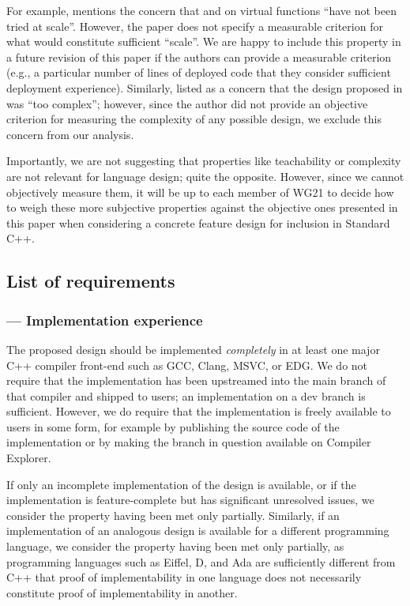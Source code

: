 For example, \cite{P3573R0} mentions the concern that  and  on virtual functions ``have not been tried at scale''. However, the paper does not specify a measurable criterion for what would constitute sufficient ``scale''. We are happy to include this property in a future revision of this paper if the authors can provide a measurable criterion (e.g., a particular number of lines of deployed code that they consider sufficient deployment experience). Similarly, \cite{P3506R0} listed as a concern that the design proposed in \cite{P3097R0} was ``too complex''; however, since the author did not provide an objective criterion for measuring the complexity of any possible design, we exclude this concern from our analysis.

Importantly, we are not suggesting that properties like teachability or complexity are not relevant for language design; quite the opposite. However, since we cannot objectively measure them, it will be up to each member of WG21 to decide how to weigh these more subjective properties against the objective ones presented in this paper when considering a concrete feature design for inclusion in Standard C++.

\subsection{List of requirements}

\subsubsection{ --- Implementation experience}

The proposed design should be implemented \emph{completely} in at least one major C++ compiler front-end such as GCC, Clang, MSVC, or EDG. We do not require that the implementation has been upstreamed into the main branch of that compiler and shipped to users; an implementation on a dev branch is sufficient. However, we do require that the implementation is freely available to users in some form, for example by publishing the source code of the implementation or by making the branch in question available on Compiler Explorer.

If only an incomplete implementation of the design is available, or if the implementation is feature-complete but has significant unresolved issues, we consider the property having been met only partially. Similarly, if an implementation of an analogous design is available for a different programming language, we consider  the property having been met only partially, as programming languages such as Eiffel, D, and Ada are sufficiently different from C++ that proof of implementability in one language does not necessarily constitute proof of implementability in another.

